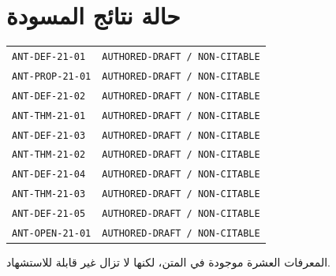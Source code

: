 \section*{حالة نتائج المسودة}

\begin{center}
\begin{tabular}{ll}
\textenglish{\texttt{ANT-DEF-21-01}} & \textenglish{\texttt{AUTHORED-DRAFT / NON-CITABLE}}\\
\textenglish{\texttt{ANT-PROP-21-01}} & \textenglish{\texttt{AUTHORED-DRAFT / NON-CITABLE}}\\
\textenglish{\texttt{ANT-DEF-21-02}} & \textenglish{\texttt{AUTHORED-DRAFT / NON-CITABLE}}\\
\textenglish{\texttt{ANT-THM-21-01}} & \textenglish{\texttt{AUTHORED-DRAFT / NON-CITABLE}}\\
\textenglish{\texttt{ANT-DEF-21-03}} & \textenglish{\texttt{AUTHORED-DRAFT / NON-CITABLE}}\\
\textenglish{\texttt{ANT-THM-21-02}} & \textenglish{\texttt{AUTHORED-DRAFT / NON-CITABLE}}\\
\textenglish{\texttt{ANT-DEF-21-04}} & \textenglish{\texttt{AUTHORED-DRAFT / NON-CITABLE}}\\
\textenglish{\texttt{ANT-THM-21-03}} & \textenglish{\texttt{AUTHORED-DRAFT / NON-CITABLE}}\\
\textenglish{\texttt{ANT-DEF-21-05}} & \textenglish{\texttt{AUTHORED-DRAFT / NON-CITABLE}}\\
\textenglish{\texttt{ANT-OPEN-21-01}} & \textenglish{\texttt{AUTHORED-DRAFT / NON-CITABLE}}
\end{tabular}
\end{center}

المعرفات العشرة موجودة في المتن، لكنها لا تزال غير قابلة للاستشهاد.
